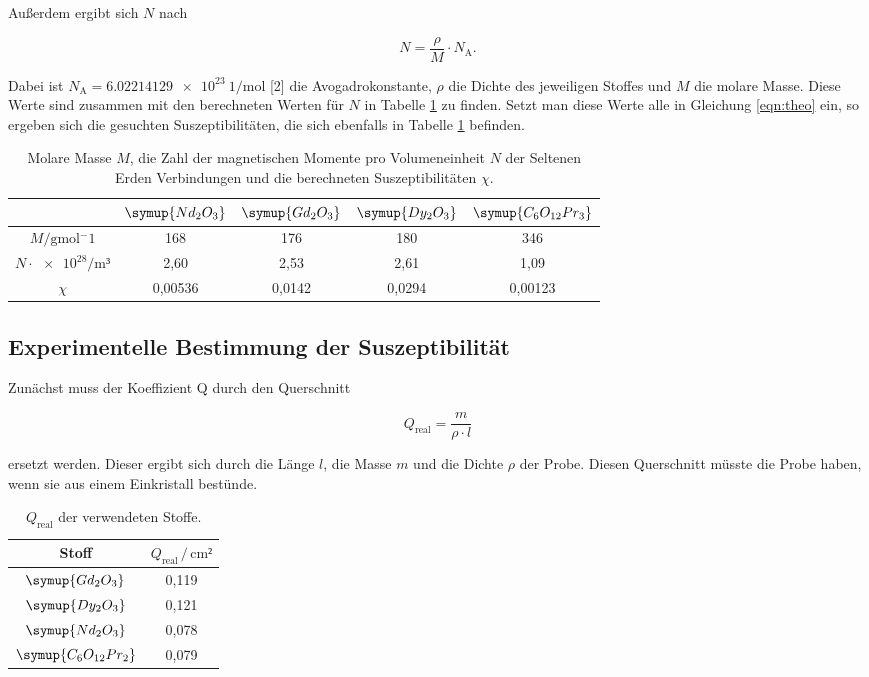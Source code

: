 Außerdem ergibt sich $N$ nach

\begin{equation*}
N = \frac{\rho}{M}\cdot N_\text{A}.
\end{equation*}

Dabei ist $N_\text{A} = \SI{6.02214129e23}{1\per\mol}$ [2] die 
Avogadrokonstante, $\rho$ die Dichte des jeweiligen Stoffes und $M$
die molare Masse. Diese Werte sind zusammen mit den berechneten Werten für $N$
in Tabelle \ref{tab:theo2} zu finden. Setzt man diese Werte alle in Gleichung  
\eqref{eqn:theo} ein, so ergeben sich die gesuchten Suszeptibilitäten, die sich ebenfalls in 
Tabelle \ref{tab:theo2} befinden. 

\begin{table}
\centering
\caption{Molare Masse $M$, die Zahl der magnetischen Momente
pro Volumeneinheit $N$ der Seltenen Erden Verbindungen und die berechneten 
Suszeptibilitäten $\chi$.}
\label{tab:theo2}
\begin{tabular}{c c c c c}
\toprule
& $\symup{Nd_2O_3}$ & $\symup{Gd_2O_3}$ & $\symup{Dy_2O_3}$ & $\symup{C_6O_{12}Pr_3}$\\
\midrule
$M/\si{\gram\mol^-1}$            & 168     & 176    & 180    & 346\\
$N \cdot \num{e28}/\si{\meter³}$ & 2,60    & 2,53   & 2,61   & 1,09\\
$\chi$                           & 0,00536 & 0,0142 & 0,0294 & 0,00123\\
\bottomrule
\end{tabular}
\end{table}


\subsection{Experimentelle Bestimmung der Suszeptibilität}

Zunächst muss der Koeffizient Q durch den Querschnitt

\begin{equation}
Q_\text{real} = \frac{m}{\rho \cdot l}
\end{equation}

ersetzt werden. Dieser ergibt sich durch die Länge $l$, die Masse $m$ und 
die Dichte $\rho$ der Probe. Diesen Querschnitt müsste die Probe haben, wenn 
sie aus einem Einkristall bestünde.

\begin{table}
\centering
\caption{$Q_\text{real}$ der verwendeten Stoffe.}
\label{tab:Messdaten2}
\begin{tabular}{c c}
\toprule
Stoff & $Q_\text{real} \,/\, \si{\centi\meter²}$\\
\midrule
$\symup{Gd_2O_3}$ & 0,119\\
$\symup{Dy_2O_3}$ & 0,121\\
$\symup{Nd_2O_3}$ & 0,078\\
$\symup{C_6O_\text{12}Pr_2}$ & 0,079\\
\bottomrule
\end{tabular}
\end{table}

